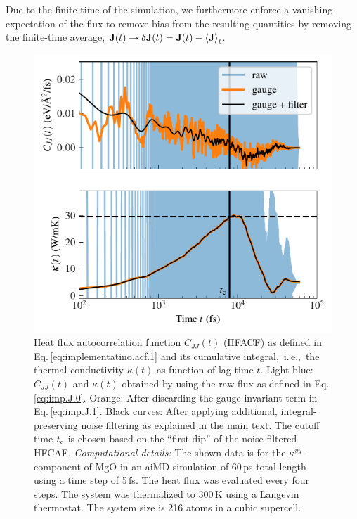 Due to the finite time of the simulation, we furthermore enforce a vanishing expectation of the flux to remove bias from the resulting quantities by removing the finite-time average, ${\bf J} (t) \to \delta {\bf J} (t) = {\bf J} (t) - \braket{{\bf J}}_t$.
%
\begin{figure}
	\includegraphics[width=\textwidth]{./data/plots/implementation/MgO/hfacf_data_yy_3.pdf}
	\caption{Heat flux autocorrelation function $C_{JJ}(t)$ (HFACF) as defined in Eq.\,\eqref{eq:implementatino.acf.1} and its cumulative integral,~i.\,e.,~the thermal conductivity $\kappa (t)$ as function of lag time $t$. Light blue: $C_{JJ}(t)$ and $\kappa (t)$ obtained by using the raw flux as defined in Eq.\,\eqref{eq:imp.J.0}. Orange: After discarding the gauge-invariant term in Eq.\,\eqref{eq:imp.J.1}. Black curves: After applying additional, integral-preserving noise filtering as explained in the main text. The cutoff time $t_{\rm c}$ is chosen based on the ``first dip'' of the noise-filtered HFCAF.
	\emph{Computational details:} The shown data is for the $\kappa^{yy}$-component of MgO in an aiMD simulation of 60\,ps total length using a time step of 5\,fs. The heat flux was evaluated every four steps. The system was thermalized to 300\,K using a Langevin thermostat. The system size is 216 atoms in a cubic supercell.}
	\label{fig:imp.hfacf.kappa.1}
\end{figure}

